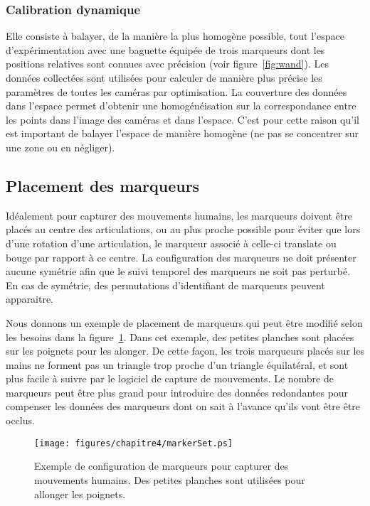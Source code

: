 \subsubsection{Calibration dynamique}
Elle consiste à balayer, de la manière la plus
homogène possible, tout l'espace d'expérimentation avec une baguette équipée de trois marqueurs
dont les positions relatives sont connues avec précision (voir figure~\ref{fig:wand}).
Les données collectées sont utilisées pour calculer de manière plus précise
les paramètres de toutes les caméras par optimisation.
La couverture des données dans l'espace permet d'obtenir une homogénéisation
sur la correspondance entre les points dans l'image des caméras et dans 
l'espace. C'est pour cette raison qu'il est important de balayer l'espace de manière homogène (ne pas se concentrer
sur une zone ou en négliger).

\subsection{Placement des marqueurs}
Idéalement pour capturer des mouvements humains,
les marqueurs doivent être placés au centre des articulations, ou au plus proche possible
pour éviter que lors d'une rotation d'une articulation, le marqueur associé
à celle-ci translate ou bouge par rapport à ce centre. 
La configuration des marqueurs ne doit présenter aucune 
symétrie afin que le suivi temporel des marqueurs ne soit pas perturbé. En cas de symétrie,
des permutations d'identifiant de marqueurs peuvent apparaitre.

Nous donnons un exemple de placement de marqueurs qui peut être modifié selon
les besoins dans la figure~\ref{fig:markerSet}. Dans cet exemple,
des petites planches sont placées sur les poignets
pour les alonger. De cette façon, les trois marqueurs placés sur les mains ne forment pas
un triangle trop proche d'un triangle équilatéral, et sont plus facile à suivre par le logiciel
de capture de mouvements. Le nombre de marqueurs peut être plus grand pour introduire des données
redondantes pour compenser les données des marqueurs dont on sait à l'avance
qu'ils vont être être occlus.
\begin{figure}[p]
  \begin{center}
    \texttt{[image: figures/chapitre4/markerSet.ps]}
  \end{center}
  \caption[Placements des marqueurs.]{Exemple de configuration de marqueurs pour capturer des mouvements humains. Des
  petites planches sont utilisées pour allonger les poignets.}
  \label{fig:markerSet}
\end{figure}


